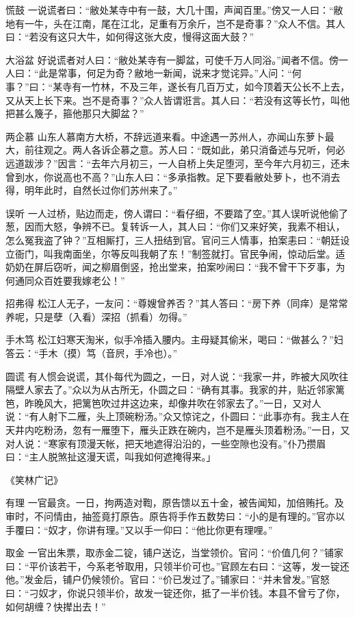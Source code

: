 \documentclass[12pt,UTF8]{ctexbook}
\begin{document}
慌鼓
一说谎者曰：“敝处某寺中有一鼓，大几十围，声闻百里。”傍又一人曰：“敝地有一牛，头在江南，尾在江北，足重有万余斤，岂不是奇事？”众人不信。其人曰：“若没有这只大牛，如何得这张大皮，慢得这面大鼓？”

大浴盆
好说谎者对人曰：“敝处某寺有一脚盆，可使千万人同浴。”闻者不信。傍一人曰：“此是常事，何足为奇？敝地一新闻，说来才觉诧异。”人问：“何事？”曰：“某寺有一竹林，不及三年，遂长有几百万丈，如今顶着天公长不上去，又从天上长下来。岂不是奇事？”众人皆谓诳言。其人曰：“若没有这等长竹，叫他把甚么篾子，箍他那只大脚盆？”

两企慕
山东人慕南方大桥，不辞远道来看。中途遇一苏州人，亦闻山东萝卜最大，前往观之。两人各诉企慕之意。苏人曰：“既如此，弟只消备述与兄听，何必远道跋涉？”因言：“去年六月初三，一人自桥上失足堕河，至今年六月初三，还未曾到水，你说高也不高？”山东人曰：“多承指教。足下要看敝处萝卜，也不消去得，明年此时，自然长过你们苏州来了。”

误听
一人过桥，贴边而走，傍人谓曰：“看仔细，不要踏了空。”其人误听说他偷了葱，因而大怒，争辨不已。复转诉一人，其人曰：“你们又来好笑，我素不相认，怎么冤我盗了钟？”互相厮打，三人扭结到官。官问三人情事，拍案恚曰：“朝廷设立衙门，叫我南面坐，尔等反叫我朝了东！”制签就打。官民争闹，惊动后堂。适奶奶在屏后窃听，闻之柳眉倒竖，抢出堂来，拍案吵闹曰：“我不曾干下歹事，为何通同众百姓要我嫁老公！”

招弗得
松江人无子，一友问：“尊嫂曾养否？”其人答曰：“房下养（同痒）是常常养呢，只是孽（入看）深招（抓看）勿得。”

手木笃
松江妇寒天淘米，似手冷插入腰内。主母疑其偷米，喝曰：“做甚么？”妇答云：“手木（摸）笃（音屄，手冷也）。”

圆谎
有人惯会说谎，其仆每代为圆之，一日，对人说：“我家一井，昨被大风吹往隔壁人家去了。”众以为从古所无，仆圆之曰：“确有其事。我家的井，贴近邻家篱笆，昨晚风大，把篱笆吹过井这边来，却像井吹在邻家去了。”一日，又对人说：“有人射下二雁，头上顶碗粉汤。”众又惊诧之，仆圆曰：“此事亦有。我主人在天井内吃粉汤，忽有一雁堕下，雁头正跌在碗内，岂不是雁头顶着粉汤。”一日，又对人说：“寒家有顶漫天帐，把天地遮得沿沿的，一些空隙也没有。”仆乃攒眉曰：“主人脱煞扯这漫天谎，叫我如何遮掩得来。」

\backmatter
《笑林广记》

有理
一官最贪。一日，拘两造对鞫，原告馈以五十金，被告闻知，加倍贿托。及审时，不问情由，抽签竟打原告。原告将手作五数势曰：“小的是有理的。”官亦以手覆曰：“奴才，你讲有理。”又以手一仰曰：“他比你更有理哩。”

取金
一官出朱票，取赤金二锭，铺户送讫，当堂领价。官问：“价值几何？”铺家曰：“平价该若干，今系老爷取用，只领半价可也。”官顾左右曰：“这等，发一锭还他。”发金后，铺户仍候领价。官曰：“价已发过了。”铺家曰：“并未曾发。”官怒曰：“刁奴才，你说只领半价，故发一锭还你，抵了一半价钱。本县不曾亏了你，如何胡缠？快撵出去！”
\end{document}
